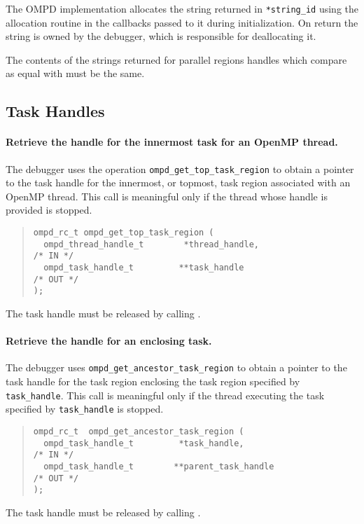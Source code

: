 The OMPD implementation allocates the string returned in \texttt{*string\_id}
using the allocation routine in the callbacks passed to it
during initialization.
On return the string is owned by the debugger, which is responsible
for deallocating it.

The contents of the strings returned for parallel regions handles
which compare as equal with
must be the same.

\subsection{Task Handles}
\label{task-handles:sec}
\paragraph{Retrieve the handle for the innermost task for an OpenMP thread.}
The  debugger uses the operation  \verb|ompd_get_top_task_region|
to obtain a pointer to the task handle for the innermost, or topmost,
task region associated with an OpenMP thread.
This call is meaningful only if the thread whose handle is provided is stopped.
\begin{quote}
\begin{lstlisting}
ompd_rc_t ompd_get_top_task_region (
  ompd_thread_handle_t        *thread_handle,                       /* IN */
  ompd_task_handle_t         **task_handle                         /* OUT */
);
\end{lstlisting}
\end{quote}
The task handle must be released by calling
.

\paragraph{Retrieve the handle for an enclosing task.}
The  debugger uses \verb|ompd_get_ancestor_task_region| to obtain
a pointer to the task handle for the task region enclosing the
task region specified by \verb|task_handle|.
This call is meaningful only if the thread executing the task specified by
\verb|task_handle|  is stopped.
\begin{quote}
\begin{lstlisting}
ompd_rc_t  ompd_get_ancestor_task_region (
  ompd_task_handle_t         *task_handle,                          /* IN */
  ompd_task_handle_t        **parent_task_handle                   /* OUT */
);
\end{lstlisting}
\end{quote}
The task handle must be released by calling
.
 
